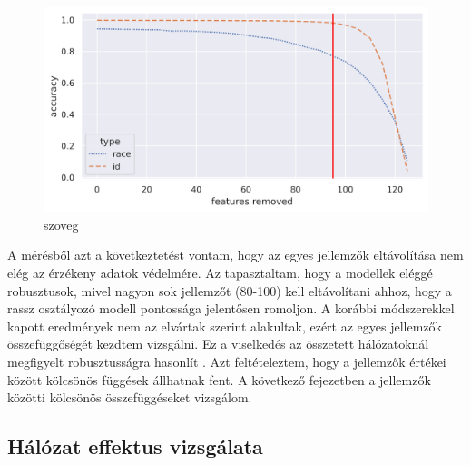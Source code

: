 \begin{figure}[ht]
	\centering
	\includegraphics[width=0.9\columnwidth]{figures/imp_race_id_graph.png}
	\caption{szoveg}
	\label{fig:retrain}
\end{figure}

A mérésből azt a következtetést vontam, hogy az egyes jellemzők eltávolítása nem elég az érzékeny adatok védelmére. Az tapasztaltam, hogy a modellek eléggé robusztusok, mivel nagyon sok jellemzőt (80-100) kell eltávolítani ahhoz, hogy a rassz osztályozó modell pontossága jelentősen romoljon. A korábbi módszerekkel kapott eredmények nem az elvártak szerint alakultak, ezért az egyes jellemzők összefüggőségét kezdtem vizsgálni. Ez a viselkedés az összetett hálózatoknál megfigyelt robusztusságra hasonlít \cite{albert2000error}. Azt feltételeztem, hogy a jellemzők értékei között kölcsönös függések állhatnak fent. A következő fejezetben a jellemzők közötti kölcsönös összefüggéseket vizsgálom.

% 


\subsection{Hálózat effektus vizsgálata}

